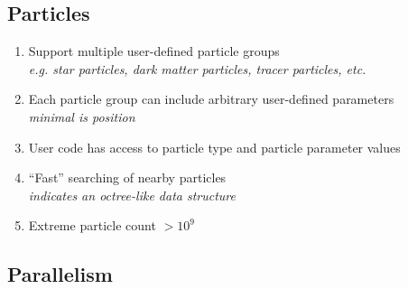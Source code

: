 \documentclass{article}
\begin{document}
\subsection{Particles}

\begin{enumerate}
    \item Support multiple user-defined particle groups
      \\ \textit{e.g. star particles, dark matter particles, tracer particles, etc. }
    \item Each particle group can include arbitrary user-defined parameters
      \\ \textit{minimal is position }
    \item User code has access to particle type and particle parameter values
    \item  ``Fast'' searching of nearby particles
       \\ \textit{indicates an octree-like data structure}
    \item Extreme particle count $> 10^9$
\end{enumerate}

\subsection{Parallelism}
\end{document}
